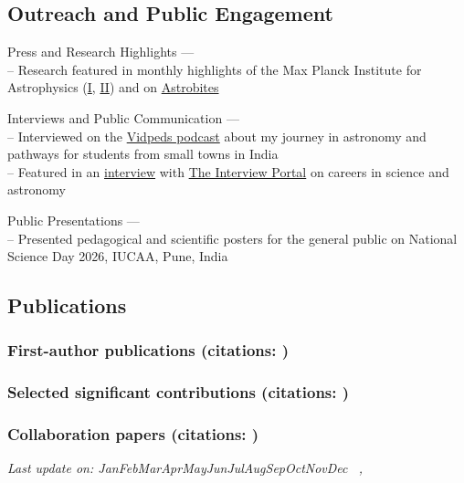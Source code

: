 \documentclass[11pt,letterpaper]{article}
\newcommand{\shortmonthname}{%
  \ifcase\month\or Jan\or Feb\or Mar\or Apr\or May\or Jun\or Jul\or Aug\or Sep\or Oct\or Nov\or Dec\fi
}
\newcommand{\lastupdatedate}{\shortmonthname\ \number\day, \number\year}
\begin{document}
\vspace{-1.5mm}
\subsection{Outreach and Public Engagement}
\begin{list}{}{\cvlist}
\item Press and Research Highlights --- \\
-- Research featured in monthly highlights of the Max Planck Institute for Astrophysics (\href{https://www.mpa-garching.mpg.de/964620/hl202107}{I}, \href{https://www.mpa-garching.mpg.de/1066558/hl202211?c=27981}{II}) and on \href{https://astrobites.org/2021/05/06/cool-metal-gas-search-thanks-it-was-automated/}{Astrobites}

\item Interviews and Public Communication --- \\
-- Interviewed on the \href{https://www.youtube.com/watch?v=WmA_PnYLeCg}{Vidpeds podcast} about my journey in astronomy and pathways for students from small towns in India\\
-- Featured in an \href{https://theinterviewportal.com/2020/03/13/astrophysicist-interview-8/}{interview} with \href{https://theinterviewportal.com/}{The Interview Portal} on careers in science and astronomy

\item Public Presentations --- \\
-- Presented pedagogical and scientific posters for the general public on National Science Day 2026, IUCAA, Pune, India
\end{list}

\ifdefined\withpubs
  
  \subsection{Publications}
  

  \subsubsection{First-author publications (citations: \firstcites)}
\begin{list}{}{\cvlist}
  \ifdefined\withfull
    
  \else
    
  \fi
\end{list}

\subsubsection{Selected significant contributions (citations: \sigcites)}
\begin{list}{}{\cvlist}
  \ifdefined\withfull
    
  \else
    
  \fi
\end{list}

\subsubsection{Collaboration papers (citations: \collabcites)}
\begin{list}{}{\cvlist}
  
\end{list}
\fi
\noindent\textit{Last update on: \lastupdatedate}
\end{document}
